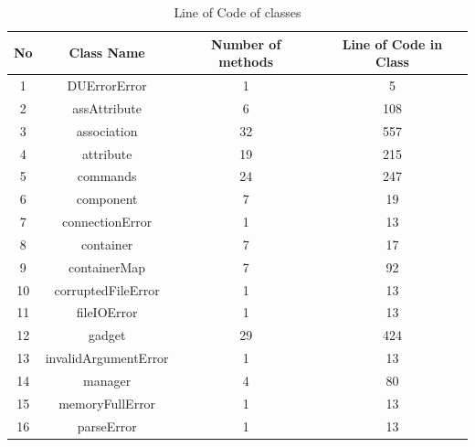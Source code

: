 \documentclass[12pt]{article}
\begin{document}
    \begin{longtable}{|c|c|c|c|}
        \caption{Line of Code of classes}
        \hline
        No & Class Name           & Number of methods & Line of Code in Class \\
        \hline
        \endfirsthead
        \endhead
        \hline
        1  & DUErrorError         & 1                 & 5                     \\ %
        2  & assAttribute         & 6                 & 108                   \\ %
        3  & association          & 32                & 557                   \\ %
        4  & attribute            & 19                & 215                   \\ %
        5  & commands             & 24                & 247                   \\ %
        6  & component            & 7                 & 19                    \\ %
        7  & connectionError      & 1                 & 13                    \\ %
        8  & container            & 7                 & 17                    \\ %
        9  & containerMap         & 7                 & 92                    \\ %
        10 & corruptedFileError   & 1                 & 13                    \\ %
        11 & fileIOError          & 1                 & 13                    \\ %
        12 & gadget               & 29                & 424                   \\ %
        13 & invalidArgumentError & 1                 & 13                    \\ %
        14 & manager              & 4                 & 80                    \\ %
        15 & memoryFullError      & 1                 & 13                    \\ %
        16 & parseError           & 1                 & 13                    \\ %

\end{longtable}
\end{document}
